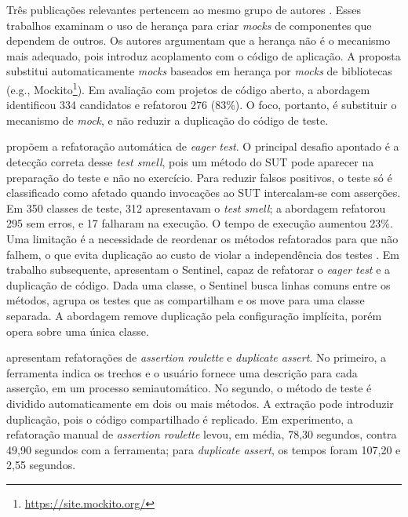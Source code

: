Três publicações relevantes pertencem ao mesmo grupo de autores \cite{wang:etal:2021,wang:etal:2022,wang:etal:2023}. Esses trabalhos examinam o uso de herança para criar \textit{mocks} de componentes que dependem de outros. Os autores argumentam que a herança não é o mecanismo mais adequado, pois introduz acoplamento com o código de aplicação. A proposta substitui automaticamente \textit{mocks} baseados em herança por \textit{mocks} de bibliotecas (e.g., Mockito\footnote{\url{https://site.mockito.org/}}). Em avaliação com projetos de código aberto, a abordagem identificou 334 candidatos e refatorou 276 (83\%). O foco, portanto, é substituir o mecanismo de \textit{mock}, e não reduzir a duplicação do código de teste.

 propõem a refatoração automática de \textit{eager test}. O principal desafio apontado é a detecção correta desse \textit{test smell}, pois um método do SUT pode aparecer na preparação do teste e não no exercício. Para reduzir falsos positivos, o teste só é classificado como afetado quando invocações ao SUT intercalam-se com asserções. Em 350 classes de teste, 312 apresentavam o \textit{test smell}; a abordagem refatorou 295 sem erros, e 17 falharam na execução. O tempo de execução aumentou 23\%. Uma limitação é a necessidade de reordenar os métodos refatorados para que não falhem, o que evita duplicação ao custo de violar a independência dos testes \cite{meszaros:2007}. Em trabalho subsequente,  apresentam o Sentinel, capaz de refatorar o \textit{eager test} e a duplicação de código. Dada uma classe, o Sentinel busca linhas comuns entre os métodos, agrupa os testes que as compartilham e os move para uma classe separada. A abordagem remove duplicação pela configuração implícita, porém opera sobre uma única classe.

 apresentam refatorações de \textit{assertion roulette} e \textit{duplicate assert}. No primeiro, a ferramenta indica os trechos e o usuário fornece uma descrição para cada asserção, em um processo semiautomático. No segundo, o método de teste é dividido automaticamente em dois ou mais métodos. A extração pode introduzir duplicação, pois o código compartilhado é replicado. Em experimento, a refatoração manual de \textit{assertion roulette} levou, em média, 78,30 segundos, contra 49,90 segundos com a ferramenta; para \textit{duplicate assert}, os tempos foram 107,20 e 2,55 segundos.

